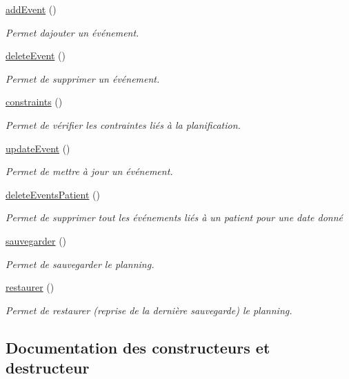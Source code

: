 \begin{DoxyCompactItemize}
\hyperlink{class_planning_a84bf8d328b55382259fb2b7fc20de09a}{add\+Event} ()
\begin{DoxyCompactList}\small\item\em Permet d\textquotesingle{}ajouter un événement. \end{DoxyCompactList}\item 
\hyperlink{class_planning_a197c471a87c2aec5de71515df72b0500}{delete\+Event} ()
\begin{DoxyCompactList}\small\item\em Permet de supprimer un événement. \end{DoxyCompactList}\item 
\hyperlink{class_planning_ac05390330a3ae8718841eeb0a641c59d}{constraints} ()
\begin{DoxyCompactList}\small\item\em Permet de vérifier les contraintes liés à la planification. \end{DoxyCompactList}\item 
\hyperlink{class_planning_a98d895eb72d210bad07437f5b0a395b1}{update\+Event} ()
\begin{DoxyCompactList}\small\item\em Permet de mettre à jour un événement. \end{DoxyCompactList}\item 
\hyperlink{class_planning_acff72c08ea0453801ab71d6d49e69c39}{delete\+Events\+Patient} ()
\begin{DoxyCompactList}\small\item\em Permet de supprimer tout les événements liés à un patient pour une date donné \end{DoxyCompactList}\item 
\hyperlink{class_planning_aeb1146ae1c0a9e5f31214b9dbced1140}{sauvegarder} ()
\begin{DoxyCompactList}\small\item\em Permet de sauvegarder le planning. \end{DoxyCompactList}\item 
\hyperlink{class_planning_a419130e49b8ddc19ffa6f8febbcb722d}{restaurer} ()
\begin{DoxyCompactList}\small\item\em Permet de restaurer (reprise de la dernière sauvegarde) le planning. \end{DoxyCompactList}\end{DoxyCompactItemize}


\subsection{Documentation des constructeurs et destructeur}
\mbox{\label{class_planning_a146136bb4d11559d4e1e03ee27cdc1d5}} 
